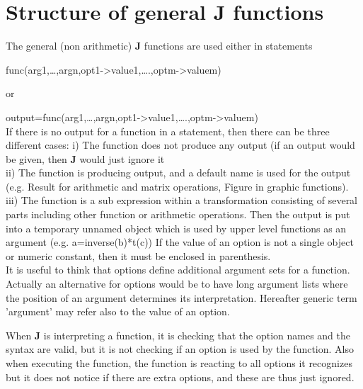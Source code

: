 \section{Structure of general J functions}
\label{jfuncs}
 The general (non arithmetic) \textbf{J} functions are used either in statements

 func(arg1,…,argn,opt1->value1,….,optm->valuem)

 or

 output=func(arg1,…,argn,opt1->value1,….,optm->valuem)\\
 If there is no output for a function in a statement, then there can be three different cases:
 i) The function does not produce any output (if an output would be given, then \textbf{J} would just
 ignore it\\
 ii) The function is producing output, and a default name is used for the output (e.g. Result
 for arithmetic and matrix operations, Figure in graphic functions).\\
 iii) The function is a sub expression within a transformation consisting of several parts including
 other function or arithmetic operations. Then the output is put into a temporary unnamed
 object which is used by upper level functions as an argument (e.g. a=\textcolor{VioletRed}{inverse}(b)*t(c))
 If the value of an option is not a single object or numeric constant, then it must be enclosed in
 parenthesis.\\
 It is useful to think that options define additional argument sets for a function. Actually
 an alternative for options would be to have long argument lists where the position of an
 argument determines its interpretation. Hereafter generic term 'argument' may refer also to
 the value of an option.

 When \textbf{J} is interpreting a function, it is checking that the option names and the syntax
 are valid, but it is not checking if an option is used by the function. Also when executing the
 function, the function is reacting to all options it recognizes but it does not notice if there are
 extra options, and these are thus just ignored.

